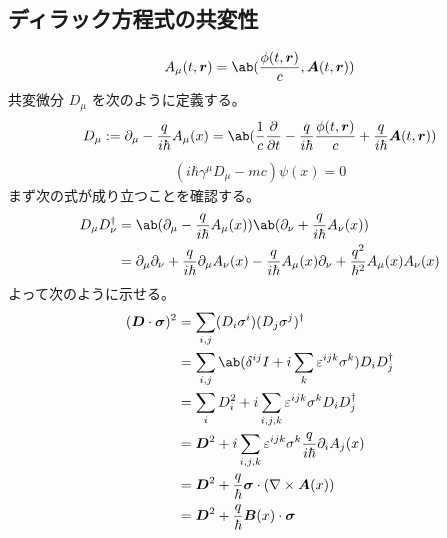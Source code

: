 \documentclass[uplatex,dvipdfmx,a4paper,11pt]{jlreq}
\theoremstyle{definition}
\newcommand{\rr}{\bm{r}}
\newcommand{\vnabla}{\mathbf{\nabla}}
\numberwithin{equation}{section}
\begin{document}
\subsection{ディラック方程式の共変性}
\begin{align}
  A_\mu(t, \rr) = \ab(\frac{\phi(t, \rr)}{c}, \bm{A}(t, \rr))
\end{align}
共変微分 $D_\mu$ を次のように定義する。
\begin{align}
  D_\mu := \partial_\mu - \frac{q}{i\hbar}A_\mu(x) = \ab(\frac{1}{c}\diffp{}{t} - \frac{q}{i\hbar}\frac{\phi(t, \rr)}{c} + \frac{q}{i\hbar}\bm{A}(t, \rr))
\end{align}
\begin{align}
  (i\hbar\gamma^\mu D_\mu - mc)\psi(x) = 0
\end{align}
まず次の式が成り立つことを確認する。
\begin{align}
  D_\mu D_\nu^\dagger & = \ab(\partial_\mu - \frac{q}{i\hbar}A_\mu(x))\ab(\partial_\nu + \frac{q}{i\hbar}A_\nu(x))                                                      \\
                      & = \partial_\mu\partial_\nu + \frac{q}{i\hbar}\partial_\mu A_\nu(x) - \frac{q}{i\hbar}A_\mu(x)\partial_\nu + \frac{q^2}{\hbar^2}A_\mu(x)A_\nu(x)
\end{align}
よって次のように示せる。
\begin{align}
  (\bm{D}\cdot\bm{\sigma})^2 & = \sum_{i,j}(D_i\sigma^i)(D_j\sigma^j)^\dagger                                      \\
                             & = \sum_{i,j}\ab(\delta^{ij}I + i\sum_{k}\varepsilon^{ijk}\sigma^k)D_iD_j^\dagger    \\
                             & = \sum_{i}D_i^2 + i\sum_{i,j,k}\varepsilon^{ijk}\sigma^kD_iD_j^\dagger              \\
                             & = \bm{D}^2 + i\sum_{i,j,k}\varepsilon^{ijk}\sigma^k\frac{q}{i\hbar}\partial_iA_j(x) \\
                             & = \bm{D}^2 + \frac{q}{\hbar}\bm{\sigma}\cdot(\vnabla\times\bm{A}(x))                \\
                             & = \bm{D}^2 + \frac{q}{\hbar}\bm{B}(x)\cdot\bm{\sigma}
\end{align}
\end{document}
